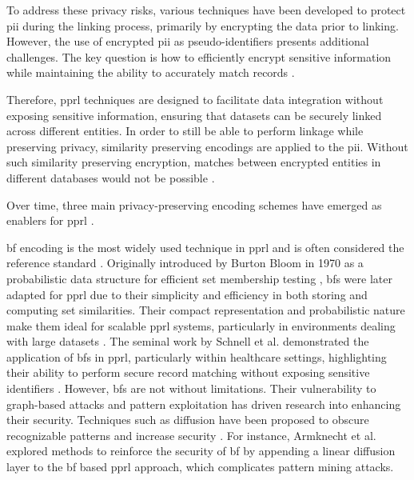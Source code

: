 To address these privacy risks, various techniques have been developed to protect \ac{pii} during the linking process, primarily by encrypting the data prior to linking. 
However, the use of encrypted \ac{pii} as pseudo-identifiers presents additional challenges.
The key question is how to efficiently encrypt sensitive information while maintaining the ability to accurately match records \cite{schnell2009privacy}.

Therefore, \ac{pprl} techniques are designed to facilitate data integration without exposing sensitive information, ensuring that datasets can be securely linked across different entities.
In order to still be able to perform linkage while preserving privacy, similarity preserving encodings are applied to the \ac{pii}.
Without such similarity preserving encryption, matches between encrypted entities in different databases would not be possible \cite{schnell2009privacy, vatsalan2017privacy}.

Over time, three main privacy-preserving encoding schemes have emerged as enablers for \ac{pprl} \cite{vidanage2020graph, schaefer2024}.

\ac{bf} encoding is the most widely used technique in \ac{pprl} and is often considered the reference standard \cite{schaefer2024}. 
Originally introduced by Burton Bloom in 1970 as a probabilistic data structure for efficient set membership testing \cite{bloom1970space}, \ac{bf}s were later adapted for \ac{pprl} due to their simplicity and efficiency in both storing and computing set similarities. 
Their compact representation and probabilistic nature make them ideal for scalable \ac{pprl} systems, particularly in environments dealing with large datasets \cite{schnell2009privacy}. 
The seminal work by Schnell et al. demonstrated the application of \ac{bf}s in \ac{pprl}, particularly within healthcare settings, highlighting their ability to perform secure record matching without exposing sensitive identifiers \cite{schnell2009privacy}.
However, \ac{bf}s are not without limitations. 
Their vulnerability to graph-based attacks and pattern exploitation has driven research into enhancing their security. 
Techniques such as diffusion have been proposed to obscure recognizable patterns and increase security \cite{schaefer2024,armknecht2023strengthening}. 
For instance, Armknecht et al. \cite{armknecht2023strengthening} explored methods to reinforce the security of \ac{bf} by appending a linear diffusion layer to the \ac{bf} based \ac{pprl} approach, which complicates pattern mining attacks.

